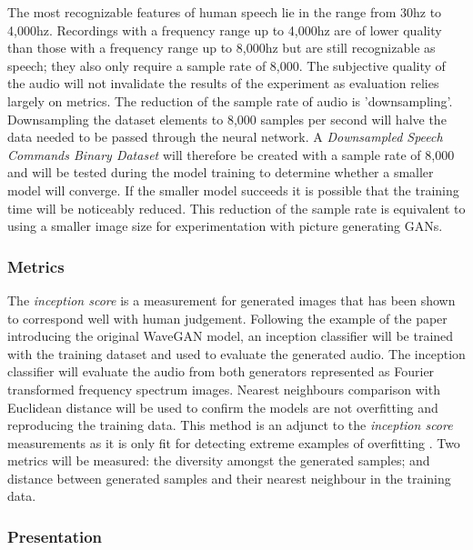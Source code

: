 \documentclass[a4paper, dvipsnames, titlepage]{article}
\begin{document}
The most recognizable features of human speech lie in the range from 30hz to 4,000hz.
Recordings with a frequency range up to 4,000hz are of lower quality than those with a frequency range up to 8,000hz but are still recognizable as speech; they also only require a sample rate of 8,000.
The subjective quality of the audio will not invalidate the results of the experiment as evaluation relies largely on metrics.
\newline
\newline
The reduction of the sample rate of audio is 'downsampling'.
Downsampling the dataset elements to 8,000 samples per second will halve the data needed to be passed through the neural network.
A \textit{Downsampled Speech Commands Binary Dataset} will therefore be created with a sample rate of 8,000 and will be tested during the model training to determine whether a smaller model will converge.
If the smaller model succeeds it is possible that the training time will be noticeably reduced.
This reduction of the sample rate is equivalent to using a smaller image size for experimentation with picture generating GANs.

\subsubsection{Metrics}

The \textit{inception score} is a measurement for generated images that has been shown to correspond well with human judgement.
Following the example of the paper introducing the original WaveGAN model, an inception classifier will be trained with the training dataset and used to evaluate the generated audio.
The inception classifier will evaluate the audio from both generators represented as Fourier transformed frequency spectrum images.
\newline
\newline
Nearest neighbours comparison with Euclidean distance will be used to confirm the models are not overfitting and reproducing the training data.
This method is an adjunct to the \textit{inception score} measurements as it is only fit for detecting extreme examples of overfitting \citep{2015arXiv151101844T}.
Two metrics will be measured: the diversity amongst the generated samples; and distance between generated samples and their nearest neighbour in the training data.

\subsubsection{Presentation}
\end{document}
